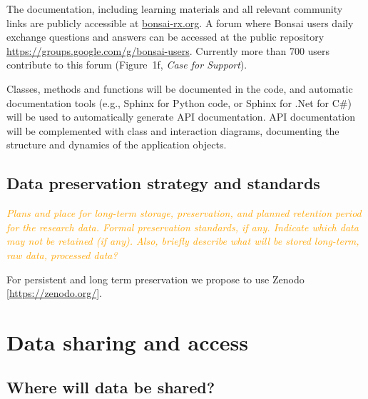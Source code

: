 \documentclass[a4paper,11pt]{article}
\renewcommand{\footnote}[1]{ [#1]}
\begin{document}

The documentation, including learning materials and all relevant community
links are publicly accessible at \url{bonsai-rx.org}. A forum where Bonsai
users daily exchange questions and answers can be accessed at the public
repository \url{https://groups.google.com/g/bonsai-users}. Currently more than
700 users contribute to this forum (Figure~1f, \emph{Case for Support}).

Classes, methods and functions will be documented in the code, and automatic
documentation tools (e.g., Sphinx for Python code, or Sphinx for .Net for C\#)
will be used to automatically generate API documentation. API documentation
will be complemented with class and interaction diagrams, documenting the
structure and dynamics of the application objects.

\subsection{Data preservation strategy and standards}

\textcolor{orange}{\textit{Plans and place for long-term storage, preservation,
and planned retention period for the research data. Formal preservation
standards, if any. Indicate which data may not be retained (if any). Also,
briefly describe what will be stored long-term, raw data, processed data?}}

For persistent and long term preservation we propose to use
Zenodo\footnote{\url{https://zenodo.org/}}.

\section{Data sharing and access}
\subsection{Where will data be shared?}
\end{document}
